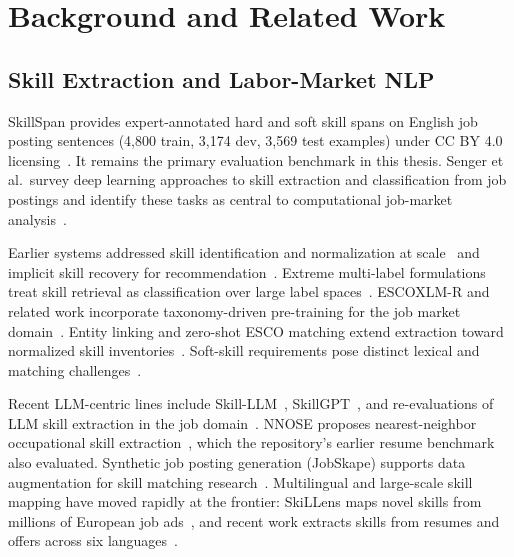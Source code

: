 \documentclass[12pt,oneside]{report}
\begin{document}
\chapter{Background and Related Work}
\label{ch:background}

\section{Skill Extraction and Labor-Market NLP}

SkillSpan provides expert-annotated hard and soft skill spans on English job posting sentences (4{,}800 train, 3{,}174 dev, 3{,}569 test examples) under CC BY 4.0 licensing~\cite{zhang2022skillspan}.
It remains the primary evaluation benchmark in this thesis.
Senger et al.\ survey deep learning approaches to skill extraction and classification from job postings and identify these tasks as central to computational job-market analysis~\cite{senger2024survey}.

Earlier systems addressed skill identification and normalization at scale~\cite{zhao2015skill,hoang2018largescale} and implicit skill recovery for recommendation~\cite{gugnani2020implicit}.
Extreme multi-label formulations treat skill retrieval as classification over large label spaces~\cite{bhola2020retrieving,goyal2023jobxmlc}.
ESCOXLM-R and related work incorporate taxonomy-driven pre-training for the job market domain~\cite{zhang2023escoxlmr,levrang2014esco}.
Entity linking and zero-shot ESCO matching extend extraction toward normalized skill inventories~\cite{zhang2024entitylinking,clavie2023batteries}.
Soft-skill requirements pose distinct lexical and matching challenges~\cite{sayfullina2018softskill,calanca2019responsible}.

Recent LLM-centric lines include Skill-LLM~\cite{herandi2024skillllm}, SkillGPT~\cite{li2023skillgpt}, and re-evaluations of LLM skill extraction in the job domain~\cite{nguyen2024rethinking}.
NNOSE proposes nearest-neighbor occupational skill extraction~\cite{zhang2024nnose}, which the repository's earlier resume benchmark also evaluated.
Synthetic job posting generation (JobSkape) supports data augmentation for skill matching research~\cite{magron2024jobskape}.
Multilingual and large-scale skill mapping have moved rapidly at the frontier: SkiLLens maps novel skills from millions of European job ads~\cite{desanto2026skillens}, and recent work extracts skills from resumes and offers across six languages~\cite{vasquezrodriguez2026sixlanguages,kavas2025multilingual}.
\end{document}
